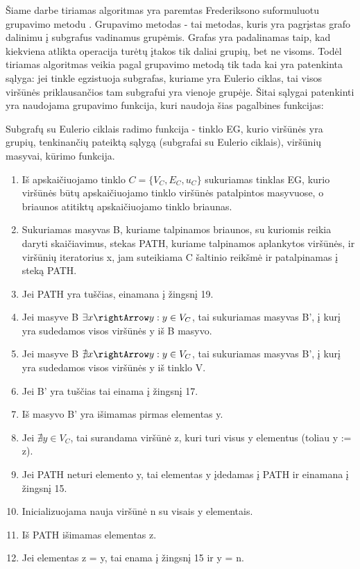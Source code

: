 Šiame darbe tiriamas algoritmas yra paremtas Frederiksono suformuluotu grupavimo metodu \cite{DSfUoMST}. Grupavimo metodas - tai metodas, kuris yra pagrįstas grafo dalinimu į subgrafus vadinamus grupėmis. Grafas yra padalinamas taip, kad kiekviena atlikta operacija turėtų įtakos tik daliai grupių, bet ne visoms. Todėl tiriamas algoritmas veikia pagal grupavimo metodą tik tada kai yra patenkinta sąlyga: jei tinkle egzistuoja subgrafas, kuriame yra Eulerio ciklas, tai visos viršūnės priklausančios tam subgrafui yra vienoje grupėje. Šitai sąlygai patenkinti yra naudojama grupavimo funkcija, kuri naudoja šias pagalbines funkcijas:

Subgrafų su Eulerio ciklais radimo funkcija - tinklo EG, kurio viršūnės yra grupių, tenkinančių pateiktą sąlygą (subgrafai su Eulerio ciklais), viršūnių masyvai, kūrimo funkcija.
\begin{enumerate}
	\item Iš apskaičiuojamo tinklo $C=\{V_C, E_C, u_C\}$ sukuriamas tinklas EG, kurio viršūnės būtų apskaičiuojamo tinklo viršūnės patalpintos masyvuose, o briaunos atitiktų apskaičiuojamo tinklo briaunas.
	\item Sukuriamas masyvas B, kuriame talpinamos briaunos, su kuriomis reikia daryti skaičiavimus, stekas PATH, kuriame talpinamos aplankytos viršūnės, ir viršūnių iteratorius x, jam suteikiama C šaltinio reikšmė ir patalpinamas į steką PATH.
	\item Jei PATH yra tuščias, einamana į žingsnį 19.
	\item Jei masyve B $\exists x \rightArrow y : y \in V_C$, tai sukuriamas masyvas B', į kurį yra sudedamos visos viršūnės y iš B masyvo.
	\item Jei masyve B $\nexists x \rightArrow y : y \in V_C$, tai sukuriamas masyvas B', į kurį yra sudedamos visos viršūnės y iš tinklo V.
	\item Jei B' yra tuščias tai einama į žingsnį 17.
	\item Iš masyvo B' yra išimamas pirmas elementas y.
	\item Jei $\nexists y \in V_C$, tai surandama viršūnė z, kuri turi visus y elementus (toliau y := z).
	\item Jei PATH neturi elemento y, tai elementas y įdedamas į PATH ir einamana į žingsnį 15.
	\item Inicializuojama nauja viršūnė n su visais y elementais.
	\item Iš PATH išimamas elementas z.
	\item Jei elementas z = y, tai enama į žingsnį 15 ir y = n.

\end{enumerate}
